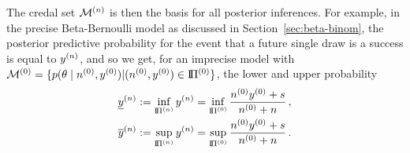 The credal set $\mathcal{M}^{(n)}$ is then the basis for all posterior inferences. For example,
in the precise Beta-Bernoulli model as discussed in Section~\ref{sec:beta-binom},
the posterior predictive probability %
for the event that a future single draw is a success is equal to $y^{(n)}$, and so we get,
for an imprecise model with $\mathcal{M}^{(0)} = \{p(\theta\mid n^{(0)}, y^{(0)}) \vert (n^{(0)}, y^{(0)}) \in \text{I}\!\Pi^{(0)}\}$,
the lower and upper probability
\begin{align*}
\underline{y}^{(n)} &:= \inf_{\text{I}\!\Pi^{(n)}} y^{(n)} = \inf_{\text{I}\!\Pi^{(0)}} \frac{n^{(0)}y^{(0)} + s}{n^{(0)} +n}\,, \\
\overline{y}^{(n)} &:= \sup_{\text{I}\!\Pi^{(n)}} y^{(n)} = \sup_{\text{I}\!\Pi^{(0)}} \frac{n^{(0)}y^{(0)} + s}{n^{(0)} +n}\,.
\end{align*}

